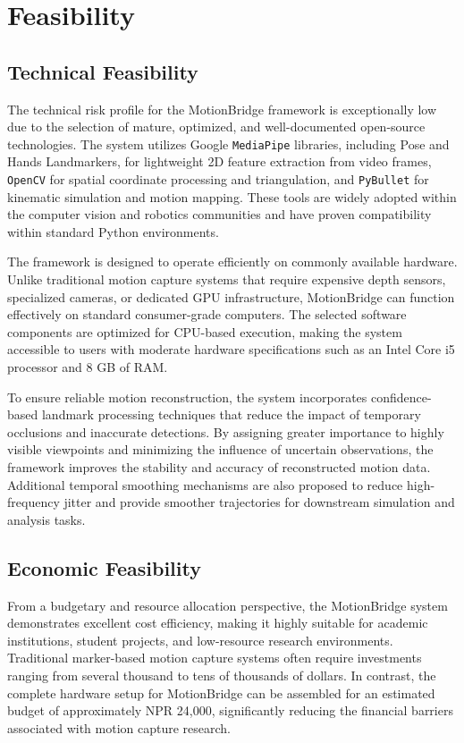 \chapter[FEASIBILITY]{Feasibility}
\section{Technical Feasibility}

The technical risk profile for the MotionBridge framework is exceptionally low due to the selection of mature, optimized, and well-documented open-source technologies. The system utilizes Google \texttt{MediaPipe} libraries, including Pose and Hands Landmarkers, for lightweight 2D feature extraction from video frames, \texttt{OpenCV} for spatial coordinate processing and triangulation, and \texttt{PyBullet} for kinematic simulation and motion mapping. These tools are widely adopted within the computer vision and robotics communities and have proven compatibility within standard Python environments.

The framework is designed to operate efficiently on commonly available hardware. Unlike traditional motion capture systems that require expensive depth sensors, specialized cameras, or dedicated GPU infrastructure, MotionBridge can function effectively on standard consumer-grade computers. The selected software components are optimized for CPU-based execution, making the system accessible to users with moderate hardware specifications such as an Intel Core i5 processor and 8 GB of RAM.

To ensure reliable motion reconstruction, the system incorporates confidence-based landmark processing techniques that reduce the impact of temporary occlusions and inaccurate detections. By assigning greater importance to highly visible viewpoints and minimizing the influence of uncertain observations, the framework improves the stability and accuracy of reconstructed motion data. Additional temporal smoothing mechanisms are also proposed to reduce high-frequency jitter and provide smoother trajectories for downstream simulation and analysis tasks.

\section{Economic Feasibility}

From a budgetary and resource allocation perspective, the MotionBridge system demonstrates excellent cost efficiency, making it highly suitable for academic institutions, student projects, and low-resource research environments. Traditional marker-based motion capture systems often require investments ranging from several thousand to tens of thousands of dollars. In contrast, the complete hardware setup for MotionBridge can be assembled for an estimated budget of approximately NPR 24,000, significantly reducing the financial barriers associated with motion capture research.

